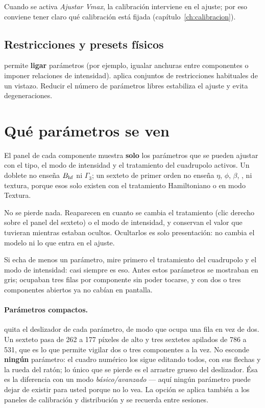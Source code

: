 \begin{nota}
Cuando se activa \emph{Ajustar Vmax}, la calibración interviene en el ajuste; por
eso conviene tener claro qué calibración está fijada (capítulo~\ref{ch:calibracion}).
\end{nota}

\subsection{Restricciones y presets físicos}

 permite \textbf{ligar}
parámetros (por ejemplo, igualar anchuras entre componentes o imponer relaciones
de intensidad).  aplica
conjuntos de restricciones habituales de un vistazo. Reducir el número de
parámetros libres estabiliza el ajuste y evita degeneraciones.

\section{Qué parámetros se ven}
\label{sec:params-visibles}

El panel de cada componente muestra \textbf{solo} los parámetros que se pueden
ajustar con el tipo, el modo de intensidad y el tratamiento del cuadrupolo
activos. Un doblete no enseña $B_{\mathrm{hf}}$ ni $\Gamma_3$; un sexteto de primer orden
no enseña $\eta$, $\phi$, $\beta$, ,  ni textura, porque
esos solo existen con el tratamiento Hamiltoniano o en modo Textura.

No se pierde nada. Reaparecen en cuanto se cambia el tratamiento (clic derecho
sobre el panel del sexteto) o el modo de intensidad, y conservan el valor que
tuvieran mientras estaban ocultos. Ocultarlos es solo presentación: no cambia el
modelo ni lo que entra en el ajuste.

\begin{truco}
Si echa de menos un parámetro, mire primero el tratamiento del cuadrupolo y el
modo de intensidad: casi siempre es eso. Antes estos parámetros se mostraban en
gris; ocupaban tres filas por componente sin poder tocarse, y con dos o tres
componentes abiertos ya no cabían en pantalla.
\end{truco}

\paragraph{Parámetros compactos.}  quita el
deslizador de cada parámetro, de modo que ocupa una fila en vez de dos. Un
sexteto pasa de 262 a 177 píxeles de alto y tres sextetes apilados de 786 a 531,
que es lo que permite vigilar dos o tres componentes a la vez. No esconde
\textbf{ningún} parámetro: el cuadro numérico los sigue editando todos, con sus
flechas y la rueda del ratón; lo único que se pierde es el arrastre grueso del
deslizador. Ésa es la diferencia con un modo \emph{básico/avanzado} --- aquí
ningún parámetro puede dejar de existir para usted porque no lo vea. La opción
se aplica también a los paneles de calibración y distribución y se recuerda
entre sesiones.

